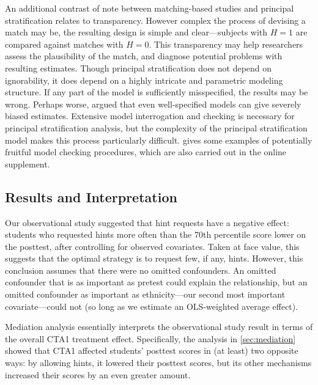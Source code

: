 \documentclass{article}\usepackage[]{graphicx}\usepackage[]{color}
\begin{document}
An additional contrast of note between matching-based studies and
principal stratification relates to transparency.
However complex the process of devising a match may be, the resulting
design is simple and clear---subjects with $H=1$ are compared against
matches with $H=0$.
This transparency may help researchers assess the plausibility of the
match, and diagnose potential problems with resulting estimates.
Though principal stratification does not depend on ignorability, it does depend on a highly
intricate and parametric modeling structure.
If any part of the model is sufficiently misspecified, the results may
be wrong.
Perhaps worse, \citet{feller2016principal} argued that even well-specified
models can give severely biased estimates.
Extensive model interrogation and checking is necessary for principal stratification
analysis, but the complexity of the principal stratification model makes this process
particularly difficult.
\citet{aoas} gives some examples of potentially fruitful model
checking procedures, which are also carried out in the online supplement.

\subsection{Results and Interpretation}

Our observational study suggested that hint requests have a negative effect: students who
requested hints more often than the 70th
percentile score lower on the posttest, after controlling for observed
covariates.
Taken at face value, this suggests that the optimal strategy is to request few, if any, hints.
However, this conclusion assumes that there were no omitted confounders.
An omitted confounder that is as important as pretest could explain the relationship, but an omitted confounder as important as ethnicity---our second most important covariate---could not (so long as we estimate an OLS-weighted average effect).

Mediation analysis essentially interprets the observational study result in terms of the
overall CTA1 treatment effect.
Specifically, the analysis in \ref{sec:mediation} showed that CTA1 affected students'
posttest scores in (at least) two opposite ways: by allowing hints, it
lowered their posttest scores, but its other mechanisms increased
their scores by an even greater amount.
\end{document}
